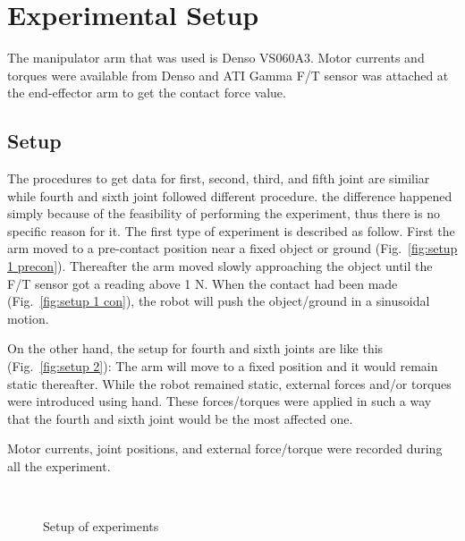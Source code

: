 \documentclass[letterpaper, 10 pt, conference]{ieeeconf}
\newcommand{\fref}[1]{Fig.~\ref{#1}}
\begin{document}

      \section{Experimental Setup}
The manipulator arm that was used is Denso VS060A3. Motor currents and torques were available from Denso and ATI Gamma F/T sensor was attached at the end-effector arm to get the contact force value.  
   
\subsection{Setup}
\label{setup}
The procedures to get data for first, second, third, and fifth joint are similiar while fourth and sixth joint followed different procedure. the difference happened simply because of the feasibility of performing the experiment, thus there is no specific reason for it. The first type of experiment is described as follow. First the arm moved to a pre-contact position near a fixed object or ground (\fref{fig:setup 1 precon}). Thereafter the arm moved slowly approaching the object until the F/T sensor got a reading above 1 N. When the contact had been made (\fref{fig:setup 1 con}), the robot will push the object/ground in a sinusoidal motion.

On the other hand, the setup for fourth and sixth joints are like this (\fref{fig:setup 2}): The arm will move to a fixed position and it would remain static thereafter. While the robot remained static, external forces and/or torques were introduced using hand. These forces/torques were applied in such a way that the fourth and sixth joint would be the most affected one.

Motor currents, joint positions, and external force/torque were recorded during all the experiment.

\begin{figure}[ht]
  \centering
  \,
  \,
  \,
  \caption{Setup of experiments}
\end{figure}
\end{document}
